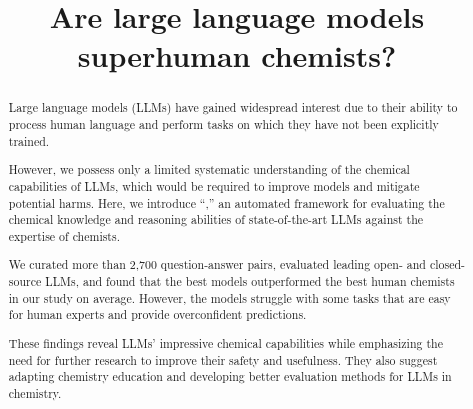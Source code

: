 \documentclass[11pt, oneside]{article}
\title{\textsf{Are large language models superhuman chemists?}}
\begin{document}
\maketitle

\clearpage
\begin{abstract}
Large language models (LLMs) have gained widespread interest due to their ability to process human language and perform tasks on which they have not been explicitly trained.

However, we possess only a limited systematic understanding of the chemical capabilities of LLMs, which would be required to improve models and mitigate potential harms.
Here, we introduce \enquote{\chembench,} an automated framework for evaluating the chemical knowledge and reasoning abilities of state-of-the-art LLMs against the expertise of chemists.

We curated more than 2,700 question-answer pairs, evaluated leading open- and closed-source LLMs, and found that the best models outperformed the best human chemists in our study on average.
However, the models struggle with some tasks that are easy for human experts and provide overconfident predictions.

These findings reveal LLMs' impressive chemical capabilities while emphasizing the need for further research to improve their safety and usefulness. They also suggest adapting chemistry education and developing better evaluation methods for LLMs in chemistry.
\end{abstract}
\end{document}
